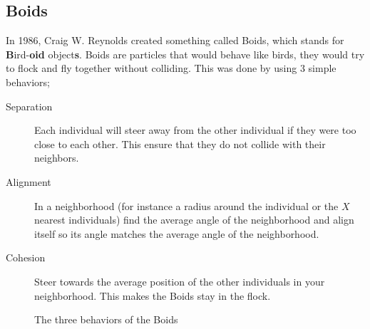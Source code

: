 \subsection{Boids}
In 1986, Craig W. Reynolds created something called Boids, which stands for \textbf{B}ird-\textbf{oid} object\textbf{s}. Boids are particles that would behave like birds, they would try to flock and fly together without colliding. This was done by using 3 simple behaviors;
\begin{description}
    \item[Separation]
        Each individual will steer away from the other individual if they were too close to each other. This ensure that they do not collide with their neighbors.
    \item[Alignment]
        In a neighborhood (for instance a radius around the individual or the $X$ nearest individuals) find the average angle of the neighborhood and align itself so its angle matches the average angle of the neighborhood.
    \item[Cohesion]
        Steer towards the average position of the other individuals in your neighborhood. This makes the Boids stay in the flock.
\end{description}
\begin{figure}[H]
    \centering
    \hfill
    \hfill
            \caption[Boids behavior]{The three behaviors of the Boids}
            \label{fig:boidbehavior}
\end{figure}

